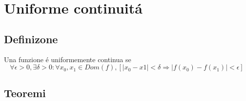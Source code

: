 \documentclass{exam}
\begin{document}
\section{Uniforme continuit\'a}
  \subsection{Definizone}
  Una funzione \'e uniformemente continua se
  \begin{equation}
    \forall \epsilon >0, \exists \delta >0 : \forall x_{0},x_{1} \in Dom(f),[|x_{0}-x{1}|<\delta \Rightarrow |f(x_{0})-f(x_{1})|<\epsilon]
  \end{equation}


  \subsection{Teoremi}
\end{document}
